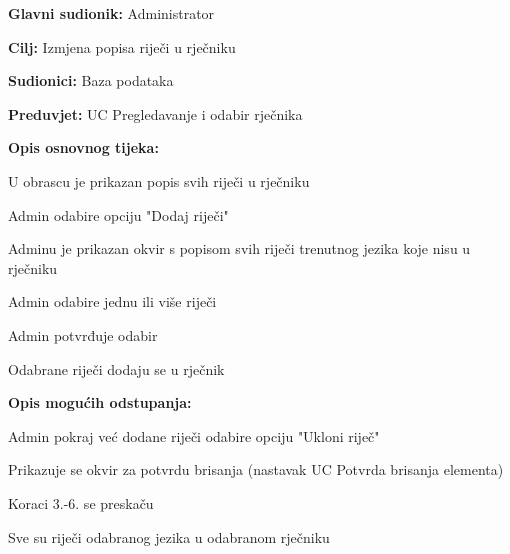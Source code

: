 \noindent {}
\begin{packed_item}

	\item \textbf{Glavni sudionik: } Administrator
	\item \textbf{Cilj: } Izmjena popisa riječi u rječniku
	\item \textbf{Sudionici: } Baza podataka
	\item \textbf{Preduvjet: } UC Pregledavanje i odabir rječnika
	\item  \textbf{Opis osnovnog tijeka:}
	
	\item[] \begin{packed_enum}
		
		\item U obrascu je prikazan popis svih riječi u rječniku
		\item Admin odabire opciju "Dodaj riječi"
		\item Adminu je prikazan okvir s popisom svih riječi trenutnog jezika koje nisu u rječniku
		\item Admin odabire jednu ili više riječi
		\item Admin potvrđuje odabir
		\item Odabrane riječi dodaju se u rječnik

	\end{packed_enum}

	\item  \textbf{Opis mogućih odstupanja:}
	
	\item[] \begin{packed_item}

		\item[2.a] Admin pokraj već dodane riječi odabire opciju "Ukloni riječ"
		\item[] \begin{packed_enum}
			
			\item Prikazuje se okvir za potvrdu brisanja (nastavak UC Potvrda brisanja elementa)
			\item Koraci 3.-6. se preskaču
			
		\end{packed_enum}

		\item[3.a] Sve su riječi odabranog jezika u odabranom rječniku
		\item[] \begin{packed_enum}
			

\end{packed_enum}
\end{packed_item}
\end{packed_item}
